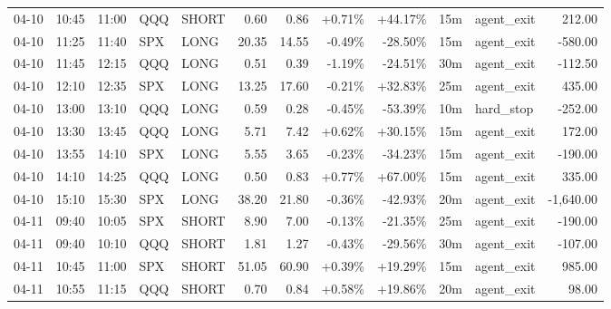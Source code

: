 \documentclass[11pt,a4paper]{article}
\begin{document}
\begin{center}
\begin{longtable}{>{\color{txtmain}}l l l l l r r r r r >{\color{txtmain}}l r}
04-10 & 10:45 & 11:00 & QQQ & SHORT & 0.60 & 0.86 & \textcolor{wingreen}{+0.71\%} & \textcolor{wingreen}{+44.17\%} & 15m & agent\_exit & \textcolor{wingreen}{212.00} \\
04-10 & 11:25 & 11:40 & SPX & LONG & 20.35 & 14.55 & \textcolor{lossred}{-0.49\%} & \textcolor{lossred}{-28.50\%} & 15m & agent\_exit & \textcolor{lossred}{-580.00} \\
04-10 & 11:45 & 12:15 & QQQ & LONG & 0.51 & 0.39 & \textcolor{lossred}{-1.19\%} & \textcolor{lossred}{-24.51\%} & 30m & agent\_exit & \textcolor{lossred}{-112.50} \\
04-10 & 12:10 & 12:35 & SPX & LONG & 13.25 & 17.60 & \textcolor{lossred}{-0.21\%} & \textcolor{wingreen}{+32.83\%} & 25m & agent\_exit & \textcolor{wingreen}{435.00} \\
04-10 & 13:00 & 13:10 & QQQ & LONG & 0.59 & 0.28 & \textcolor{lossred}{-0.45\%} & \textcolor{lossred}{-53.39\%} & 10m & hard\_stop & \textcolor{lossred}{-252.00} \\
04-10 & 13:30 & 13:45 & QQQ & LONG & 5.71 & 7.42 & \textcolor{wingreen}{+0.62\%} & \textcolor{wingreen}{+30.15\%} & 15m & agent\_exit & \textcolor{wingreen}{172.00} \\
04-10 & 13:55 & 14:10 & SPX & LONG & 5.55 & 3.65 & \textcolor{lossred}{-0.23\%} & \textcolor{lossred}{-34.23\%} & 15m & agent\_exit & \textcolor{lossred}{-190.00} \\
04-10 & 14:10 & 14:25 & QQQ & LONG & 0.50 & 0.83 & \textcolor{wingreen}{+0.77\%} & \textcolor{wingreen}{+67.00\%} & 15m & agent\_exit & \textcolor{wingreen}{335.00} \\
04-10 & 15:10 & 15:30 & SPX & LONG & 38.20 & 21.80 & \textcolor{lossred}{-0.36\%} & \textcolor{lossred}{-42.93\%} & 20m & agent\_exit & \textcolor{lossred}{-1,640.00} \\
04-11 & 09:40 & 10:05 & SPX & SHORT & 8.90 & 7.00 & \textcolor{lossred}{-0.13\%} & \textcolor{lossred}{-21.35\%} & 25m & agent\_exit & \textcolor{lossred}{-190.00} \\
04-11 & 09:40 & 10:10 & QQQ & SHORT & 1.81 & 1.27 & \textcolor{lossred}{-0.43\%} & \textcolor{lossred}{-29.56\%} & 30m & agent\_exit & \textcolor{lossred}{-107.00} \\
04-11 & 10:45 & 11:00 & SPX & SHORT & 51.05 & 60.90 & \textcolor{wingreen}{+0.39\%} & \textcolor{wingreen}{+19.29\%} & 15m & agent\_exit & \textcolor{wingreen}{985.00} \\
04-11 & 10:55 & 11:15 & QQQ & SHORT & 0.70 & 0.84 & \textcolor{wingreen}{+0.58\%} & \textcolor{wingreen}{+19.86\%} & 20m & agent\_exit & \textcolor{wingreen}{98.00} \\

\end{longtable}
\end{center}
\end{document}
